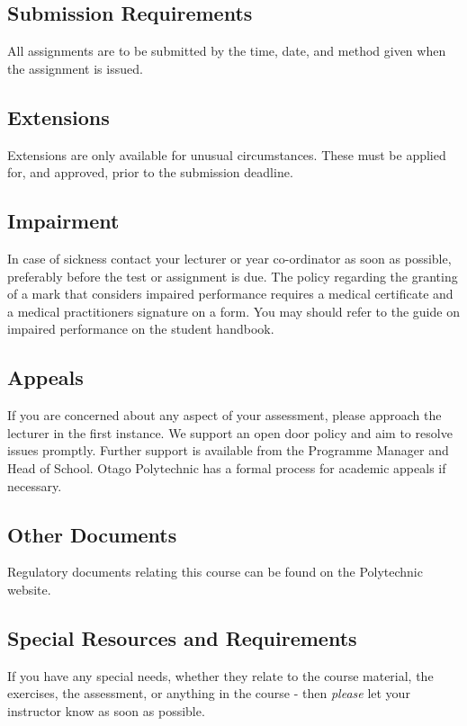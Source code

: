 \documentclass{article}
\begin{document}
\subsection*{Submission Requirements}
All assignments are to be submitted by the time, date, and method given when the assignment is issued.

\subsection*{Extensions}
Extensions are only available for unusual circumstances.  These must be applied for, and approved, prior to the submission deadline.

\subsection*{Impairment}
In case of sickness contact your lecturer or year co-ordinator as soon as possible, preferably before the test or
assignment is due.  The policy regarding the granting of a mark that considers impaired performance requires a medical
certificate and a medical practitioners signature on a form. You may should refer to the guide on impaired performance
on the student handbook.

\subsection*{Appeals}
If you are concerned about any aspect of your assessment, please approach the lecturer in the first instance.  We support
an open door policy and aim to resolve issues promptly.  Further support is available from the Programme
Manager and Head of School. Otago Polytechnic has a formal process for academic appeals if necessary.

\subsection*{Other Documents}
Regulatory documents relating this course can be found on the Polytechnic website.

\subsection*{Special Resources and Requirements}
If you have any special needs, whether they relate to the course material, the exercises, the assessment, or anything in the course -
then \emph{please} let your instructor know as soon as possible.
\end{document}
